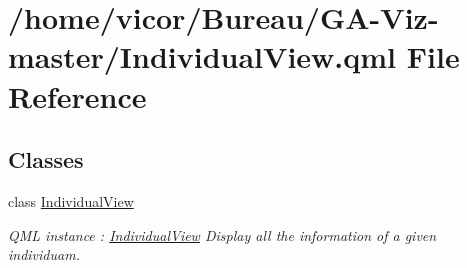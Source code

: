 \hypertarget{_individual_view_8qml}{}\section{/home/vicor/\+Bureau/\+G\+A-\/\+Viz-\/master/\+Individual\+View.qml File Reference}
\label{_individual_view_8qml}
\subsection*{Classes}
\begin{DoxyCompactItemize}
\item 
class \hyperlink{class_individual_view}{Individual\+View}
\begin{DoxyCompactList}\small\item\em Q\+ML instance \+: \hyperlink{class_individual_view}{Individual\+View} Display all the information of a given individuam. \end{DoxyCompactList}\end{DoxyCompactItemize}
